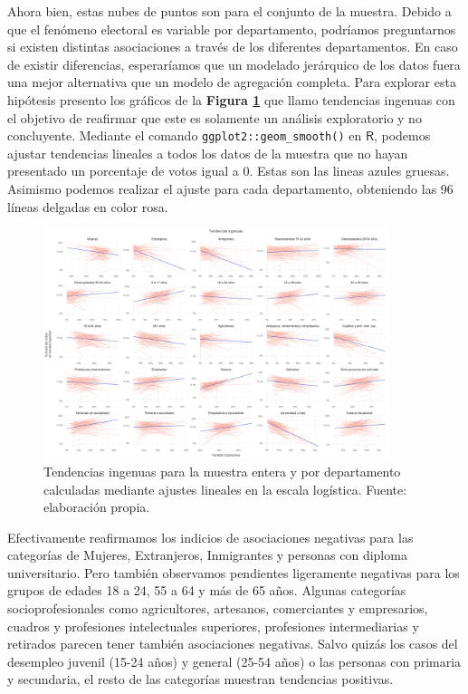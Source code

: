 Ahora bien, estas nubes de puntos son para el conjunto de la muestra. Debido a que el fenómeno electoral es variable por departamento, podríamos preguntarnos si existen distintas asociaciones a través de los diferentes departamentos. En caso de existir diferencias, esperaríamos que un modelado jerárquico de los datos fuera una mejor alternativa que un modelo de agregación completa. Para explorar esta hipótesis presento los gráficos de la \textbf{Figura \ref{fig:Tendencias_Ingenuas_Muestra}} que llamo tendencias ingenuas con el objetivo de reafirmar que este es solamente un análisis exploratorio y no concluyente. Mediante el comando \verb|ggplot2::geom_smooth()| en $\mathsf{R}$, podemos ajustar tendencias lineales a todos los datos de la muestra que no hayan presentado un porcentaje de votos igual a 0. Estas son las lineas azules gruesas. Asimismo podemos realizar el ajuste para cada departamento, obteniendo las 96 líneas delgadas en color rosa.\\ 

\begin{figure}[h]
	\centering
	\includegraphics[width = 0.9\textwidth]{Figs/AED/Tend_Ingenuas_Todas_MUESTRA}
	\caption{Tendencias ingenuas para la muestra entera y por departamento calculadas mediante ajustes lineales en la escala logística. Fuente: elaboración propia.}
	\label{fig:Tendencias_Ingenuas_Muestra}	
\end{figure}

Efectivamente reafirmamos los indicios de asociaciones negativas para las categorías de Mujeres, Extranjeros, Inmigrantes y personas con diploma universitario. Pero también observamos pendientes ligeramente negativas para los grupos de edades 18 a 24, 55 a 64 y más de 65 años. Algunas categorías socioprofesionales como agricultores, artesanos, comerciantes y empresarios, cuadros y profesiones intelectuales superiores, profesiones intermediarias y retirados parecen tener también asociaciones negativas. Salvo quizás los casos del desempleo juvenil (15-24 años) y general (25-54 años) o las personas con primaria y secundaria, el resto de las categorías muestran tendencias positivas.\\

